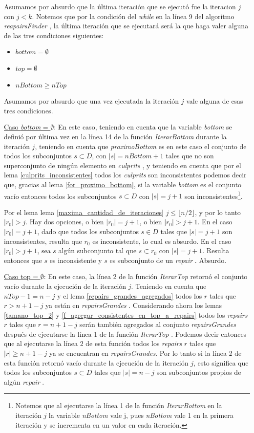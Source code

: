 \documentclass[11pt,a4paper,twoside]{tesis}
\newcommand{\parteEntera}{\lfloor n/2 \rfloor}
\newcommand{\reapairs}{\textit{repairs }}
\newcommand{\reapair}{\textit{repair }}
\newcommand{\reapairsGrandes}{\textit{repairsGrandes }}
\newcommand{\reapairsFinder}{\textit{reapairsFinder }}
\newcommand{\nBottom}{\textit{nBottom }}
\newcommand{\bottom}{\textit{bottom }}
\newcommand{\iterarBottom}{\textit{IterarBottom }}
\newcommand{\iterarTop}{\textit{IterarTop }}
\newcommand{\proximoBottom}{\textit{proximoBottom }}
\newcommand{\culprits}{\textit{culprits }}
\begin{document}
Asumamos por absurdo que la última iteración que se ejecutó fue la iteracion $j$ con $j < k$. Notemos que por la condición del \textit{while} en la línea 9 del algoritmo \reapairsFinder, la última iteración que se ejecutará será la que haga valer alguna de las tres condiciones siguientes:

\begin{itemize}
    \item $bottom = \emptyset$
    \item $top = \emptyset$
    \item $nBottom \geq nTop$
\end{itemize}

Asumamos por absurdo que una vez ejecutada la iteración $j$ vale alguna de esas tres condiciones.

\underline{Caso \bottom = $\emptyset$}: En este caso, teniendo en cuenta que la variable \bottom  se definió por última vez en la línea 14 de la función \iterarBottom durante la iteración $j$, teniendo en cuenta que \proximoBottom es en este caso el conjunto de todos los subconjuntos $s \subset D$, con $|s| = nBottom + 1$ tales que no son superconjunto de ningún elemento en \culprits, y teniendo en cuenta que por el lema \ref{culprits_inconsistentes} todos los \culprits son inconsistentes podemos decir que, gracias al lema \ref{for_proximo_bottom}, si la variable \bottom es el conjunto vacío entonces todos los subconjuntos $s \subset D$ con $|s| = j + 1$ son inconsistentes\footnote{Notemos que al ejecutarse la línea 1 de la función \iterarBottom en la iteración $j$ la variable \nBottom vale j, pues \nBottom vale 1 en la primera iteración y se incrementa en un valor en cada iteración.}.

Por el lema lema \ref{maxima_cantidad_de_iteraciones} $j\leq \parteEntera$, y por lo tanto $|r_0| > j$. Hay dos opciones, o bien $|r_0| = j + 1$, o bien $|r_0| > j + 1$. En el caso $|r_0| = j + 1$, dado que todos los subconjuntos $s \in D$ tales que $|s| = j + 1$ son inconsistentes, resulta que $r_0$ es inconsistente, lo cual es absurdo. En el caso $|r_0| > j + 1$, sea $s$ algún subconjunto tal que $s \subset r_0$ con $|s| = j + 1$. Resulta entonces que $s$ es inconsistente y $s$ es subconjunto de un \reapair. Absurdo. 

\underline{Caso top = $\emptyset$}: En este caso, la línea 2 de la función \iterarTop retornó el conjunto vacío durante la ejecución de la iteración $j$. Teniendo en cuenta que $nTop - 1 = n - j$ y el lema \ref{repairs_grandes_agregados} todos los \repairs $r$ tales que $r > n + 1 - j$ ya están en \reapairsGrandes. Considerando ahora los lemas \ref{tamano_top_2} y \ref{f_agregar_consistentes_en_top_a_repairs} todos los \reapairs $r$ tales que $r = n + 1 - j$ serán también agregados al conjunto \reapairsGrandes después de ejecutarse la línea 1 de la función \iterarTop. Podemos decir entonces que al ejecutarse la línea 2 de esta función todos los \reapairs $r$ tales que $|r| \geq n + 1 - j$ ya se encuentran en \textit{repairsGrandes}. Por lo tanto si la línea 2 de esta función retornó vacío durante la ejecución de la iteración $j$, esto significa que todos los subconjuntos $s \subset D$ tales que $|s| = n - j$ son subconjuntos propios de algún \reapair. 
\end{document}
